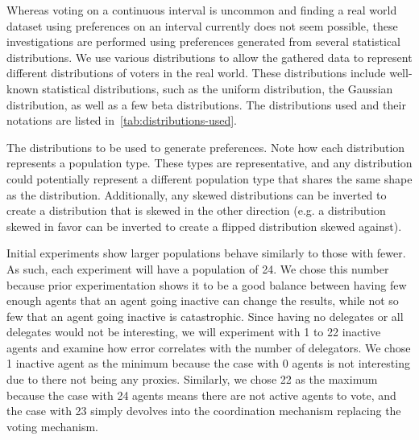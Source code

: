 Whereas voting on a continuous interval is uncommon and finding a real world dataset
using preferences on an interval currently does not seem possible, these investigations
are performed using preferences generated from several statistical distributions.
We use various distributions to allow the gathered data to represent
different distributions of voters in the real world.
These distributions include well-known statistical distributions, such as the uniform
distribution, the Gaussian distribution, as well as a few beta distributions.
The distributions used and their notations are listed
in~\autoref{tab:distributions-used}.

\begin{table}[!htbp]
    \renewcommand{\arraystretch}{1.3}

    \caption{
        The distributions to be used to generate preferences.
        Note how each distribution represents a population type.
        These types are representative, and any distribution could potentially
        represent a different population type that shares the same shape as the
        distribution.
        Additionally, any skewed distributions can be inverted to create a
        distribution that is skewed in the other direction (e.g. a distribution
        skewed in favor can be inverted to create a flipped distribution skewed
        against).
    }
    \label{tab:distributions-used}

    \centering
    
\end{table}

Initial experiments show larger populations behave similarly to those with fewer.
As such, each experiment will have a population of 24.
We chose this number because prior experimentation shows it to be a good balance
between having few enough agents that an agent going inactive can change the
results, while not so few that an agent going inactive is catastrophic.
Since having no delegates or all delegates would not be interesting, we will
experiment with 1 to 22 inactive agents and examine how error correlates with
the number of delegators.
We chose 1 inactive agent as the minimum because the case with 0 agents is not
interesting due to there not being any proxies.
Similarly, we chose 22 as the maximum because the case with 24 agents means there are
not active agents to vote, and the case with 23 simply devolves into the coordination
mechanism replacing the voting mechanism.

